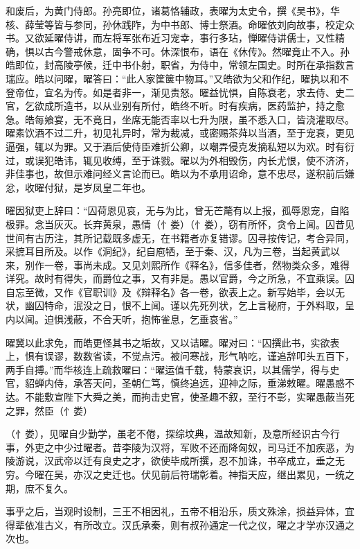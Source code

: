 \documentclass[12pt,UTF8]{ctexbook}
\begin{document}
和废后，为黄门侍郎。孙亮即位，诸葛恪辅政，表曜为太史令，撰《吴书》，华核、薛莹等皆与参同，孙休践阼，为中书郎、博士祭酒。命曜依刘向故事，校定众书。又欲延曜侍讲，而左将军张布近习宠幸，事行多玷，惮曜侍讲儒士，又性精确，惧以古今警戒休意，固争不可。休深恨布，语在《休传》。然曜竟止不入。孙皓即位，封高陵亭候，迁中书仆射，职省，为侍中，常领左国史。时所在承指数言瑞应。皓以问曜，曜答曰：“此人家筐箧中物耳。”又皓欲为父和作纪，曜执以和不登帝位，宜名为传。如是者非一，渐见责怒。曜益忧惧，自陈衰老，求去侍、史二官，乞欲成所造书，以从业别有所付，皓终不听。时有疾病，医药监护，持之愈急。皓每飨宴，无不竟日，坐席无能否率以七升为限，虽不悉入口，皆浇灌取尽。曜素饮酒不过二升，初见礼异时，常为裁减，或密赐茶荈以当酒，至于宠衰，更见逼强，辄以为罪。又于酒后使侍臣难折公卿，以嘲弄侵克发摘私短以为欢。时有衍过，或误犯皓讳，辄见收缚，至于诛戮。曜以为外相毁伤，内长尤恨，使不济济，非佳事也，故但示难问经义言论而已。皓以为不承用诏命，意不忠尽，遂积前后嫌忿，收曜付狱，是岁凤皇二年也。

曜因狱吏上辞曰：“囚荷恩见哀，无与为比，曾无芒氂有以上报，孤辱恩宠，自陷极罪。念当灰灭。长弃黄泉，愚情（忄娄）（忄娄），窃有所怀，贪令上闻。囚昔见世间有古历注，其所记载既多虚无，在书籍者亦复错谬。囚寻按传记，考合异同，采摭耳目所及。以作《洞纪》，纪自庖牺，至于秦、汉，凡为三卷，当起黄武以来，别作一卷，事尚未成。又见刘熙所作《释名》，信多佳者，然物类众多，难得详究。故时有得失，而爵位之事，又有非是。愚以官爵，今之所急，不宜乘误。囚自忘至微，又作《官职训》及《辩释名》各一卷，欲表上之。新写始毕，会以无状，幽囚特命，泯没之日，恨不上闻。谨以先死列状，乞上言秘府，于外料取，呈内以闻。迫惧浅蔽，不合天听，抱怖雀息，乞垂哀省。”

曜冀以此求免，而皓更怪其书之垢故，又以诘曜。曜对曰：“囚撰此书，实欲表上，惧有误谬，数数省读，不觉点污。被问寒战，形气呐吃，谨追辞叩头五百下，两手自搏。”而华核连上疏救曜曰：“曜运值千载，特蒙哀识，以其儒学，得与史官，貂蝉内侍，承答天问，圣朝仁笃，慎终追远，迎神之际，垂涕敕曜。曜愚惑不达。不能敷宣陛下大舜之美，而拘击史官，使圣趣不叙，至行不彰，实曜愚蔽当死之罪，然臣（忄娄）

（忄娄），见曜自少勤学，虽老不倦，探综坟典，温故知新，及意所经识古今行事，外吏之中少过曜者。昔李陵为汉将，军败不还而降匈奴，司马迁不加疾恶，为陵游说，汉武帝以迁有良史之才，欲使毕成所撰，忍不加诛，书卒成立，垂之无穷。今曜在吴，亦汉之史迁也。伏见前后符瑞彰着。神指天应，继出累见，一统之期，庶不复久。

事乎之后，当观时设制，三王不相因礼，五帝不相沿乐，质文殊涂，损益异体，宜得辈依准古义，有所改立。汉氏承秦，则有叔孙通定一代之仪，曜之才学亦汉通之次也。
\end{document}
